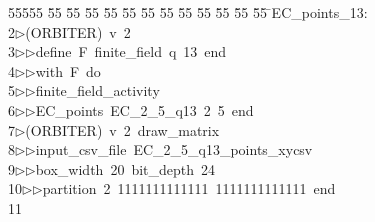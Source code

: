 %
%
\begin{tabbing}
55555 \= 55 \= 55 \= 55 \= 55 \= 55 \= 55 \= 55 \= 55 \= 55 \= 55 \= 55 \= 55 \= \>EC\_points\_13:\\[0pt]
2\>$\triangleright$\>(ORBITER)\ v\ 2\ \\[0pt]
3\>$\triangleright$\>$\triangleright$\>define\ F\ finite\_field\ q\ 13\ end\ \\[0pt]
4\>$\triangleright$\>$\triangleright$\>with\ F\ do\ \\[0pt]
5\>$\triangleright$\>$\triangleright$\>finite\_field\_activity\ \\[0pt]
6\>$\triangleright$\>$\triangleright$\>EC\_points\ EC\_2\_5\_q13\ 2\ 5\ end\\[0pt]
7\>$\triangleright$\>(ORBITER)\ v\ 2\ draw\_matrix\ \\[0pt]
8\>$\triangleright$\>$\triangleright$\>input\_csv\_file\ EC\_2\_5\_q13\_points\_xycsv\ \\[0pt]
9\>$\triangleright$\>$\triangleright$\>box\_width\ 20\ bit\_depth\ 24\ \\[0pt]
10\>$\triangleright$\>$\triangleright$\>partition\ 2\ 1111111111111\ 1111111111111\ end\\[0pt]
11\>\end{tabbing}

